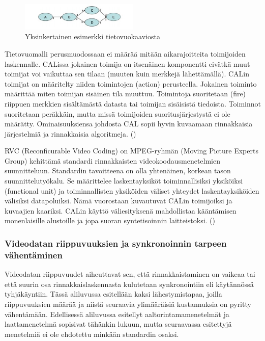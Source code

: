 \begin{figure}[ht]
	\centering
	\includegraphics[width=0.5\textwidth]{dataflow.jpg}
	\caption{Yksinkertainen esimerkki tietovuokaaviosta}
	\label{fig:dataflow}
\end{figure}

Tietovuomalli perusmuodossaan ei määrää mitään aikarajoitteita toimijoiden
laskennalle. CALissa jokainen toimija on itsenäinen komponentti eivätkä muut
toimijat voi vaikuttaa sen tilaan (muuten kuin merkkejä lähettämällä). CALin
toimijat on määritelty niiden toimintojen (action) perusteella. Jokainen
toiminto määrittää miten toimijan sisäinen tila muuttuu. Toimintoja
suoritetaan (fire) riippuen merkkien sisältämästä datasta tai toimijan
sisäisistä tiedoista. Toiminnot suoritetaan peräkkäin, mutta missä toimijoiden
suoritusjärjestystä ei ole määrätty. Ominaisuuksiensa johdosta CAL sopii hyvin 
kuvaamaan rinnakkaisia järjestelmiä ja rinnakkaisia algoritmeja. (\citealt{rvc})

RVC (Reconficurable Video Coding) on MPEG-ryhmän (Moving Picture Experts
Group) kehittämä standardi rinnakkaisten videokoodausmenetelmien suunnitteluun.
Standardin tavoitteena on olla yhtenäinen, korkean tason suunnittelutyökalu.
Se määrittelee laskentayksiköt toiminnallisiksi yksiköiksi (functional unit)
ja toiminnallisten yksiköiden väliset yhteydet laskentayksiköiden välisiksi
datapoluiksi. Nämä vuorostaan kuvautuvat CALin toimijoiksi ja kuvaajien
kaariksi. CALin käyttö väliesityksenä mahdollistaa kääntämisen monenlaisille
alustoille ja jopa suoran syntetisoinnin laitteistoksi. (\citealt{rvc})

\subsubsection{Videodatan riippuvuuksien ja synkronoinnin tarpeen vähentäminen}

Videodatan riippuvuudet aiheuttavat sen, että rinnakkaistaminen on vaikeaa tai
että suurin osa rinnakkaislaskennasta kulutetaan synkronointiin eli käytännössä
tyhjäkäyntiin. Tässä aliluvussa esitellään kaksi lähestymistapaa, joilla
riippuvuuksien määrää ja niistä seuraavia ylimääräisiä kustannuksia on pyritty
vähentämään. Edellisessä aliluvussa esitellyt aaltorintamamenetelmät ja
laattamenetelmä sopisivat tähänkin lukuun, mutta seuraavassa esitettyjä
menetelmiä ei ole ehdotettu minkään standardin osaksi.

